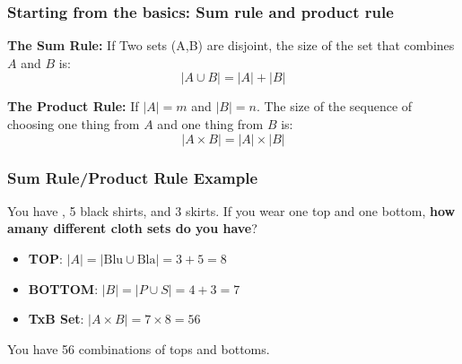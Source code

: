 \documentclass{beamer}
\begin{document}
\begin{frame}
  \frametitle{Starting from the basics: Sum rule and product rule}

  {\larger

    {\bf The Sum Rule:} If Two sets (A,B) are disjoint, the size of
    the set that combines $A$ and $B$ is:
    \begin{equation}
      |A \cup B| = |A| + |B|
    \end{equation}

    \bigskip

    {\bf The Product Rule:} If $|A| = m$ and $|B| = n$. The size of
    the sequence of choosing one thing from $A$ and one thing from $B$
    is:
    \begin{equation}
      |A \times B| = |A| \times |B|
    \end{equation}
    
  }
\end{frame}

\begin{frame}
  \frametitle{Sum Rule/Product Rule Example}

  {\larger
    
    You have , \alert{5 black shirts},
     and \alert{3 skirts}.  If you wear one top and one
    bottom, {\bf how amany different cloth sets do you have}?

    \vfill
    
    \begin{itemize}
    \item {\bf TOP}: $|A| = |\text{Blu} \cup \text{Bla}| = 3 + 5 = 8$
    \item {\bf BOTTOM}: $|B| = |P \cup S| = 4 + 3 = 7$
    \item {\bf TxB Set}: $|A \times B| = 7 \times 8 = 56$
    \end{itemize}

    \bigskip

    You have 56 combinations of tops and bottoms.
  }
\end{frame}
\end{document}
